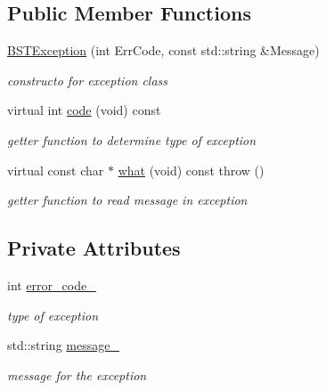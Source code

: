 \subsection*{Public Member Functions}
\begin{DoxyCompactItemize}
\item 
\hypertarget{classBSTException_af7683167b01f3b0bcc1fa583aceedf7d}{\hyperlink{classBSTException_af7683167b01f3b0bcc1fa583aceedf7d}{B\-S\-T\-Exception} (int Err\-Code, const std\-::string \&Message)}\label{classBSTException_af7683167b01f3b0bcc1fa583aceedf7d}

\begin{DoxyCompactList}\small\item\em constructo for exception class \end{DoxyCompactList}\item 
\hypertarget{classBSTException_a7eb896dd6c636f528c7e0cf9fd203f97}{virtual int \hyperlink{classBSTException_a7eb896dd6c636f528c7e0cf9fd203f97}{code} (void) const }\label{classBSTException_a7eb896dd6c636f528c7e0cf9fd203f97}

\begin{DoxyCompactList}\small\item\em getter function to determine type of exception \end{DoxyCompactList}\item 
\hypertarget{classBSTException_a6dbecababd6976f8b3c880c8e422b1ca}{virtual const char $\ast$ \hyperlink{classBSTException_a6dbecababd6976f8b3c880c8e422b1ca}{what} (void) const   throw ()}\label{classBSTException_a6dbecababd6976f8b3c880c8e422b1ca}

\begin{DoxyCompactList}\small\item\em getter function to read message in exception \end{DoxyCompactList}\end{DoxyCompactItemize}
\subsection*{Private Attributes}
\begin{DoxyCompactItemize}
\item 
\hypertarget{classBSTException_a8fc812efe0dcfdc60448493b42e96d51}{int \hyperlink{classBSTException_a8fc812efe0dcfdc60448493b42e96d51}{error\-\_\-code\-\_\-}}\label{classBSTException_a8fc812efe0dcfdc60448493b42e96d51}

\begin{DoxyCompactList}\small\item\em type of exception \end{DoxyCompactList}\item 
\hypertarget{classBSTException_a94eb46d7c60fb2db7fa3ec8faf6e76c2}{std\-::string \hyperlink{classBSTException_a94eb46d7c60fb2db7fa3ec8faf6e76c2}{message\-\_\-}}\label{classBSTException_a94eb46d7c60fb2db7fa3ec8faf6e76c2}

\begin{DoxyCompactList}\small\item\em message for the exception \end{DoxyCompactList}\end{DoxyCompactItemize}


